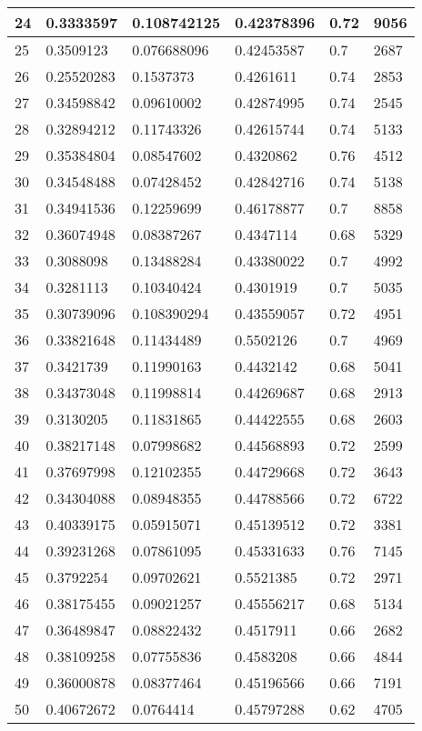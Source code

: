 \begin{longtable}{|l|l|l|l|l|l|}
24 & 0.3333597 & 0.108742125 & 0.42378396 & 0.72 & 9056 \\ \hline 
25 & 0.3509123 & 0.076688096 & 0.42453587 & 0.7 & 2687 \\ \hline 
26 & 0.25520283 & 0.1537373 & 0.4261611 & 0.74 & 2853 \\ \hline 
27 & 0.34598842 & 0.09610002 & 0.42874995 & 0.74 & 2545 \\ \hline 
28 & 0.32894212 & 0.11743326 & 0.42615744 & 0.74 & 5133 \\ \hline 
29 & 0.35384804 & 0.08547602 & 0.4320862 & 0.76 & 4512 \\ \hline 
30 & 0.34548488 & 0.07428452 & 0.42842716 & 0.74 & 5138 \\ \hline 
31 & 0.34941536 & 0.12259699 & 0.46178877 & 0.7 & 8858 \\ \hline 
32 & 0.36074948 & 0.08387267 & 0.4347114 & 0.68 & 5329 \\ \hline 
33 & 0.3088098 & 0.13488284 & 0.43380022 & 0.7 & 4992 \\ \hline 
34 & 0.3281113 & 0.10340424 & 0.4301919 & 0.7 & 5035 \\ \hline 
35 & 0.30739096 & 0.108390294 & 0.43559057 & 0.72 & 4951 \\ \hline 
36 & 0.33821648 & 0.11434489 & 0.5502126 & 0.7 & 4969 \\ \hline 
37 & 0.3421739 & 0.11990163 & 0.4432142 & 0.68 & 5041 \\ \hline 
38 & 0.34373048 & 0.11998814 & 0.44269687 & 0.68 & 2913 \\ \hline 
39 & 0.3130205 & 0.11831865 & 0.44422555 & 0.68 & 2603 \\ \hline 
40 & 0.38217148 & 0.07998682 & 0.44568893 & 0.72 & 2599 \\ \hline 
41 & 0.37697998 & 0.12102355 & 0.44729668 & 0.72 & 3643 \\ \hline 
42 & 0.34304088 & 0.08948355 & 0.44788566 & 0.72 & 6722 \\ \hline 
43 & 0.40339175 & 0.05915071 & 0.45139512 & 0.72 & 3381 \\ \hline 
44 & 0.39231268 & 0.07861095 & 0.45331633 & 0.76 & 7145 \\ \hline 
45 & 0.3792254 & 0.09702621 & 0.5521385 & 0.72 & 2971 \\ \hline 
46 & 0.38175455 & 0.09021257 & 0.45556217 & 0.68 & 5134 \\ \hline 
47 & 0.36489847 & 0.08822432 & 0.4517911 & 0.66 & 2682 \\ \hline 
48 & 0.38109258 & 0.07755836 & 0.4583208 & 0.66 & 4844 \\ \hline 
49 & 0.36000878 & 0.08377464 & 0.45196566 & 0.66 & 7191 \\ \hline 
50 & 0.40672672 & 0.0764414 & 0.45797288 & 0.62 & 4705 \\ \hline 
\end{longtable}
